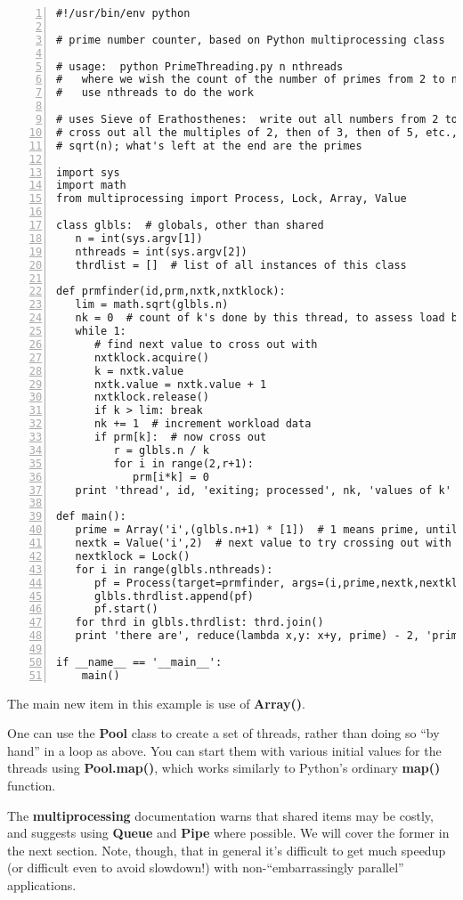 \begin{Verbatim}[fontsize=\relsize{-2},numbers=left]
#!/usr/bin/env python

# prime number counter, based on Python multiprocessing class

# usage:  python PrimeThreading.py n nthreads 
#   where we wish the count of the number of primes from 2 to n, and to
#   use nthreads to do the work

# uses Sieve of Erathosthenes:  write out all numbers from 2 to n, then
# cross out all the multiples of 2, then of 3, then of 5, etc., up to
# sqrt(n); what's left at the end are the primes

import sys
import math
from multiprocessing import Process, Lock, Array, Value

class glbls:  # globals, other than shared
   n = int(sys.argv[1])
   nthreads = int(sys.argv[2])
   thrdlist = []  # list of all instances of this class

def prmfinder(id,prm,nxtk,nxtklock):
   lim = math.sqrt(glbls.n)
   nk = 0  # count of k's done by this thread, to assess load balance
   while 1:
      # find next value to cross out with
      nxtklock.acquire()
      k = nxtk.value
      nxtk.value = nxtk.value + 1
      nxtklock.release()
      if k > lim: break
      nk += 1  # increment workload data
      if prm[k]:  # now cross out
         r = glbls.n / k
         for i in range(2,r+1):
            prm[i*k] = 0
   print 'thread', id, 'exiting; processed', nk, 'values of k'

def main():
   prime = Array('i',(glbls.n+1) * [1])  # 1 means prime, until find otherwise
   nextk = Value('i',2)  # next value to try crossing out with
   nextklock = Lock()
   for i in range(glbls.nthreads):
      pf = Process(target=prmfinder, args=(i,prime,nextk,nextklock))
      glbls.thrdlist.append(pf)
      pf.start()
   for thrd in glbls.thrdlist: thrd.join()
   print 'there are', reduce(lambda x,y: x+y, prime) - 2, 'primes'

if __name__ == '__main__':
    main()
\end{Verbatim}

The main new item in this example is use of {\bf Array()}.

One can use the {\bf Pool} class to create a set of threads, rather than
doing so ``by hand'' in a loop as above.  You can start them with
various initial values for the threads using {\bf Pool.map()}, which
works similarly to Python's ordinary {\bf map()} function.

The {\bf multiprocessing} documentation warns that shared items may be
costly, and suggests using {\bf Queue} and {\bf Pipe} where
possible.  We will cover the former in the next section.  Note, though,
that in general it's difficult to get much speedup (or difficult even to
avoid slowdown!) with non-``embarrassingly parallel'' applications.

